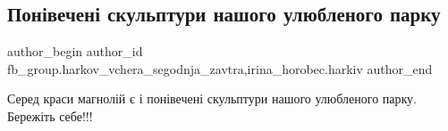  
 
 
 
 

\subsection{Понівечені скульптури нашого улюбленого парку}
\label{sec:05_05_2023.fb.fb_group.harkov_vchera_segodnja_zavtra.1.ponivecheni_skulptury_nash_park}
 
\ifcmt
 author_begin
   author_id fb_group.harkov_vchera_segodnja_zavtra,irina_horobec.harkiv
 author_end
\fi

Серед краси магнолій є і понівечені скульптури нашого улюбленого парку. Бережіть себе!!!


